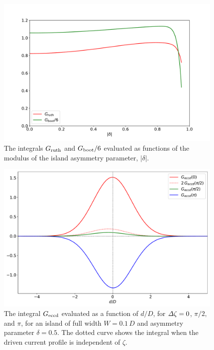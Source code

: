 \documentclass[12pt,prb,aps]{revtex4-1}
\begin{document}
\begin{figure}
\centerline{\includegraphics[width=\textwidth]{G.pdf}}
\caption{The integrals $G_{\rm ruth}$ and $G_{\rm boot}/6$ evaluated as functions of the modulus of the island asymmetry parameter, $|\delta|$.  \label{fig6}}
\end{figure}

\begin{figure}
\centerline{\includegraphics[width=\textwidth]{W01.pdf}}
\caption{The integral $G_{\rm eccd}$ evaluated as a function of $d/D$, for ${\mit\Delta}\zeta = 0$, $\pi/2,$ and $\pi$, for an  island
of full width $W=0.1\,D$ and asymmetry parameter $\delta=0.5$. The dotted curve shows the integral when the driven current profile is independent of $\zeta$. \label{fig7}}
\end{figure}
\end{document}

